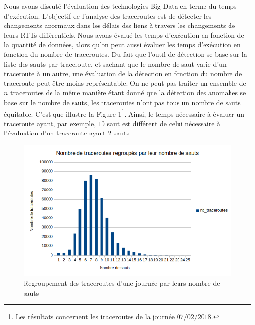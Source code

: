 Nous avons discuté l'évaluation des technologies Big Data en terme du temps d'exécution. L'objectif de l'analyse des traceroutes est de détecter les changements anormaux dans les délais des liens à travers les changements de leurs RTTs différentiels. Nous avons évalué les temps d'exécution en fonction de la quantité de données, alors qu'on peut aussi évaluer les temps d'exécution en fonction du nombre de traceroutes. Du fait que l'outil de détection se base sur la liste des sauts par traceroute, et sachant que le nombre de saut varie d'un traceroute à un autre, une évaluation de la détection en fonction du nombre de traceroute peut être moins représentable. 
On ne peut pas traiter un ensemble de $n$ traceroutes de la même manière étant donné que la détection des anomalies se base sur le nombre de sauts, les traceroutes n'ont pas tous un nombre de sauts équitable. C'est que illustre 
la Figure 	\ref{fig:traceroutes-par-sauts}\footnote{Les résultats concernent les traceroutes de la journée $07/02/2018$.}. Ainsi, le temps nécessaire à évaluer un traceroute ayant, par exemple, $10$ saut est différent de celui nécessaire à l'évaluation d'un traceroute ayant $2$ sauts. 
\begin{figure}[H]
	\centering
	\includegraphics[width=0.8\linewidth]{illustrations/traceroutes-par-sauts}
	\caption{Regroupement des traceroutes d'une journée  par leurs nombre de sauts}
	\label{fig:traceroutes-par-sauts}
\end{figure}

